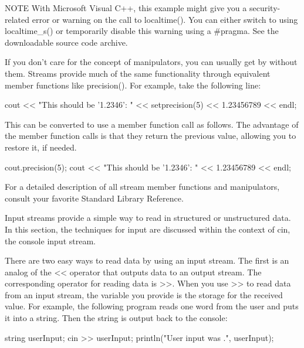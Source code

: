 \begin{myNotic}{NOTE}
With Microsoft Visual C++, this example might give you a security-related error or warning on the call to localtime(). You can either switch to using localtime\_s() or temporarily disable this warning using a \#pragma. See the downloadable source code archive.
\end{myNotic}

If you don’t care for the concept of manipulators, you can usually get by without them. Streams provide much of the same functionality through equivalent member functions like precision(). For example, take the following line:

\begin{cpp}
cout << "This should be '1.2346': " << setprecision(5) << 1.23456789 << endl;
\end{cpp}

This can be converted to use a member function call as follows. The advantage of the member function calls is that they return the previous value, allowing you to restore it, if needed.

\begin{cpp}
cout.precision(5);
cout << "This should be '1.2346': " << 1.23456789 << endl;
\end{cpp}

For a detailed description of all stream member functions and manipulators, consult your favorite Standard Library Reference.


Input streams provide a simple way to read in structured or unstructured data. In this section, the techniques for input are discussed within the context of cin, the console input stream.


There are two easy ways to read data by using an input stream. The first is an analog of the <{}< operator that outputs data to an output stream. The corresponding operator for reading data is >{}>. When you use >{}> to read data from an input stream, the variable you provide is the storage for the received value. For example, the following program reads one word from the user and puts it into a string. Then the string is output back to the console:

\begin{cpp}
string userInput;
cin >> userInput;
println("User input was {}.", userInput);
\end{cpp}

